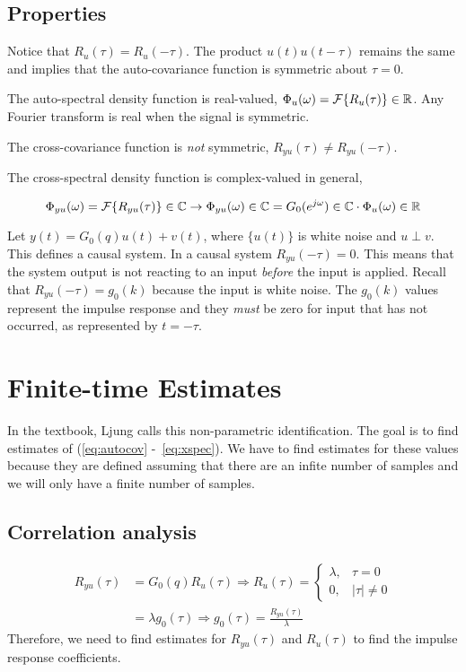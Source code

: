 \subsection{Properties}
Notice that $R_u(\tau)=R_u(-\tau)$.
The product $u(t)u(t-\tau)$ remains the same and implies that the auto-covariance function is symmetric about $\tau=0$.

The auto-spectral density function is real-valued, $\Phi_u(\omega) = \mathcal{F}\{R_u(\tau)\}\in\mathbb{R}$.
Any Fourier transform is real when the signal is symmetric.

The cross-covariance function is \textit{not} symmetric, $R_{yu}(\tau)\neq R_{yu}(-\tau)$.

The cross-spectral density function is complex-valued in general,

\begin{equation*}
\Phi_{yu}(\omega) = \mathcal{F}\{R_{yu}(\tau)\}\in\mathbb{C} \rightarrow \Phi_{yu}(\omega)\in\mathbb{C} = G_0(e^{j\omega})\in\mathbb{C} \cdot \Phi_u(\omega)\in\mathbb{R}
\end{equation*}

Let $y(t) = G_0(q)u(t)+v(t)$, where $\{u(t)\}$ is white noise and $u\perp v$.
This defines a causal system.
In a causal system $R_{yu}(-\tau)=0$.
This means that the system output is not reacting to an input \textit{before} the input is applied.
Recall that $R_{yu}(-\tau)=g_0(k)$ because the input is white noise.
The $g_0(k)$ values represent the impulse response and they \textit{must} be zero for input that has not occurred, as represented by $t=-\tau$.

\section{Finite-time Estimates}
In the textbook, Ljung calls this non-parametric identification.
The goal is to find estimates of (\ref{eq:autocov} -~\ref{eq:xspec}).
We have to find estimates for these values because they are defined assuming that there are an infite number of samples and we will only have a finite number of samples.

\subsection{Correlation analysis}
\begin{align*}
R_{yu}(\tau) &= G_0(q)R_u(\tau) \Rightarrow R_u(\tau) = \begin{cases} \lambda, & \tau=0 \\ 0, & |\tau|\neq 0 \end{cases} \\
&= \lambda g_0(\tau) \Rightarrow g_0(\tau) = \frac{R_{yu}(\tau)}{\lambda}
\end{align*}
Therefore, we need to find estimates for $R_{yu}(\tau)$ and $R_u(\tau)$ to find the impulse response coefficients.

